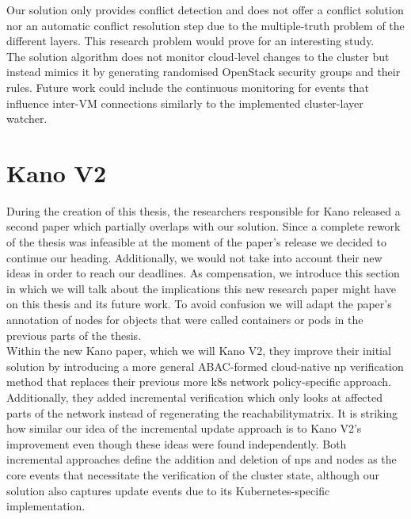 Our solution only provides conflict detection and does not offer a conflict solution nor an automatic conflict resolution step due to the multiple-truth problem of the different layers. This research problem would prove for an interesting study.
\\[10pt]

The solution algorithm does not monitor cloud-level changes to the cluster but instead mimics it by generating randomised OpenStack security groups and their rules. Future work could include the continuous monitoring for events that influence inter-VM connections similarly to the implemented cluster-layer watcher.
\\[10pt]




\section{Kano V2} \label{sec:kanov2}
During the creation of this thesis, the researchers responsible for Kano released a second paper which partially overlaps with our solution.  Since a complete rework of the thesis was infeasible at the moment of the paper's release we decided to continue our heading. Additionally, we would not take into account their new ideas in order to reach our deadlines. As compensation, we introduce this section in which we will talk about the implications this new research paper might have on this thesis and its future work. To avoid confusion we will adapt the paper's annotation of nodes for objects that were called containers or pods in the previous parts of the thesis. \cite{kano2}
\\[10pt]

Within the new Kano paper, which we will Kano V2, they improve their initial solution by introducing a more general ABAC-formed cloud-native \acrshort{np} verification method that replaces their previous more \acrshort{k8s} network policy-specific approach. Additionally, they added incremental verification which only looks at affected parts of the network instead of regenerating the reachabilitymatrix. It is striking how similar our idea of the incremental update approach is to Kano V2's improvement even though these ideas were found independently. Both incremental approaches define the addition and deletion of \acrshort{np}s and nodes as the core events that necessitate the verification of the cluster state, although our solution also captures update events due to its Kubernetes-specific implementation.
\\[10pt]


